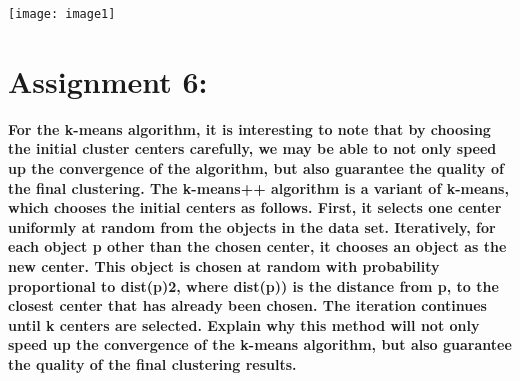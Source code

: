 \documentclass[]{article}
\begin{document}
\begin{verbatim}

\end{verbatim}
\texttt{[image: image1]}

\section*{Assignment 6:}
\textbf{
For the k-means algorithm, it is interesting to note that by choosing the initial cluster centers 
carefully, we may be able to not only speed up the convergence of the algorithm, but also 
guarantee the quality of the final clustering. The k-means++ algorithm is a variant of k-means, 
which chooses the initial centers as follows. First, it selects one center uniformly at random from 
the objects in the data set. Iteratively, for each object p other than the chosen center, it chooses 
an object as the new center. This object is chosen at random with probability proportional to 
dist(p)2, where dist(p)) is the distance from p, to the closest center that has already been chosen. 
The iteration continues until k centers are selected.
Explain why this method will not only speed up the convergence of the k-means algorithm, but 
also guarantee the quality of the final clustering results.
}
\end{document}
